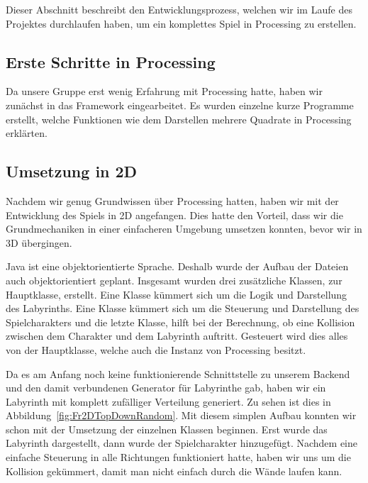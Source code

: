 Dieser Abschnitt beschreibt den Entwicklungsprozess, welchen wir im Laufe des Projektes durchlaufen haben, um ein komplettes Spiel in Processing zu erstellen.

\subsection{Erste Schritte in Processing}\label{subsec:erste-schritte}
Da unsere Gruppe erst wenig Erfahrung mit Processing hatte, haben wir zunächst in das Framework eingearbeitet. Es wurden einzelne kurze Programme erstellt, welche Funktionen wie dem Darstellen mehrere Quadrate in Processing erklärten.

\subsection{Umsetzung in 2D}\label{subsec:umsetzung-in-2D}
Nachdem wir genug Grundwissen über Processing hatten, haben wir mit der Entwicklung des Spiels in 2D angefangen. Dies hatte den Vorteil, dass wir die Grundmechaniken in einer einfacheren Umgebung umsetzen konnten, bevor wir in 3D übergingen.

Java ist eine objektorientierte Sprache. Deshalb wurde der Aufbau der Dateien auch objektorientiert geplant. Insgesamt wurden drei zusätzliche Klassen, zur Hauptklasse, erstellt. Eine Klasse kümmert sich um die Logik und Darstellung des Labyrinths. Eine Klasse kümmert sich um die Steuerung und Darstellung des Spielcharakters und die letzte Klasse, hilft bei der Berechnung, ob eine Kollision zwischen dem Charakter und dem Labyrinth auftritt. Gesteuert wird dies alles von der Hauptklasse, welche auch die Instanz von Processing besitzt.

Da es am Anfang noch keine funktionierende Schnittstelle zu unserem Backend und den damit verbundenen Generator für Labyrinthe gab, haben wir ein Labyrinth mit komplett zufälliger Verteilung generiert. Zu sehen ist dies in Abbildung~\ref{fig:Fr2DTopDownRandom}.
Mit diesem simplen Aufbau konnten wir schon mit der Umsetzung der einzelnen Klassen beginnen. Erst wurde das Labyrinth dargestellt, dann wurde der Spielcharakter hinzugefügt. Nachdem eine einfache Steuerung in alle Richtungen funktioniert hatte, haben wir uns um die Kollision gekümmert, damit man nicht einfach durch die Wände laufen kann.

